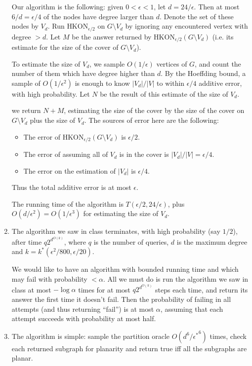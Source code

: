 \documentclass[11pt]{article} \usepackage{amssymb}
\newcommand{\eps}{\epsilon} \newcommand{\lam}{\lambda}
\begin{document}
\begin{enumerate}
  Our algorithm is the following: given $0 < \eps < 1$, let
  $d=24/\eps$. Then at most $6/d=\eps/4$ of the nodes have degree larger
  than $d$. Denote the set of these nodes by $V_d$. Run
  $\mbox{HKON}_{\eps/2}$ on $G \setminus V_d$ by ignoring any
  encountered vertex with degree $>d$. Let $M$ be the answer returned
  by $\mbox{HKON}_{\eps/2}(G \setminus V_d)$ (i.e. its estimate for
  the size of the cover of $G \setminus V_d$).

  To estimate the size of $V_d$, we sample $O(1/\eps)$ vertices of
  $G$, and count the number of them which have degree higher than
  $d$. By the Hoeffding bound, a sample of $O(1/\eps^2)$ is enough to
  know $|V_d|/|V|$ to within $\eps/4$ additive error, with high
  probability. Let $N$ be the result of this estimate of the size of
  $V_d$.

  we return $N+M$, estimating the size of the cover by the size of the
  cover on $G \setminus V_d$ plus the size of $V_d$. The sources of
  error here are the following:
  \begin{itemize}
  \item The error of $\mbox{HKON}_{\eps/2}(G \setminus V_d)$ is
    $\eps/2$.
  \item The error of assuming all of $V_d$ is in the cover is
    $|V_d|/|V|=\eps/4$.
  \item The error on the estimation of $|V_d|$ is $\eps/4$.
  \end{itemize}
  Thus the total additive error is at most $\eps$.

  The running time of the algorithm is $T(\eps/2,24/\eps)$, plus
  $O(d/\eps^2)=O(1/\eps^3)$ for estimating the size of $V_d$.

\item The algorithm we saw in class terminates, with high probability
  (say $1/2$), after time $q2^{d^{O(k)}}$, where $q$ is the number of
  queries, $d$ is the maximum degree and $k=k^*(\eps^2/800,\eps/20)$.

  We would like to have an algorithm with bounded running time and
  which may fail with probability $<\alpha$. All we must do is run the
  algorithm we saw in class at most $-\log\alpha$ times for at most
  $q2^{d^{O(k)}}$ steps each time, and return its answer the first
  time it doesn't fail. Then the probability of failing in all
  attempts (and thus returning ``fail'') is at most $\alpha$, assuming
  that each attempt succeeds with probability at most half.

\item The algorithm is simple: sample the partition oracle
  $O(d^6/{\eps^*}^6)$ times, check each returned subgraph for planarity
  and return true iff all the subgraphs are planar.


\end{enumerate}
\end{document}
